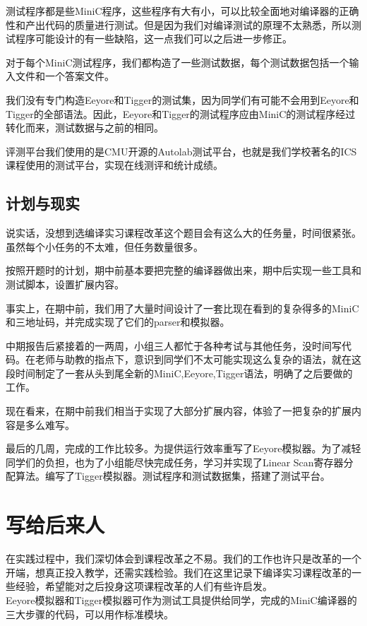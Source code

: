 \documentclass{ctexart}
\begin{document}
测试程序都是些MiniC程序，这些程序有大有小，可以比较全面地对编译器的正确性和产出代码的质量进行测试。但是因为我们对编译测试的原理不太熟悉，所以测试程序可能设计的有一些缺陷，这一点我们可以之后进一步修正。

对于每个MiniC测试程序，我们都构造了一些测试数据，每个测试数据包括一个输入文件和一个答案文件。

我们没有专门构造Eeyore和Tigger的测试集，因为同学们有可能不会用到Eeyore和Tigger的全部语法。因此，Eeyore和Tigger的测试程序应由MiniC的测试程序经过转化而来，测试数据与之前的相同。

评测平台我们使用的是CMU开源的Autolab测试平台，也就是我们学校著名的ICS课程使用的测试平台，实现在线测评和统计成绩。

\subsection{计划与现实}

说实话，没想到选编译实习课程改革这个题目会有这么大的任务量，时间很紧张。虽然每个小任务的不太难，但任务数量很多。

按照开题时的计划，期中前基本要把完整的编译器做出来，期中后实现一些工具和测试脚本，设置扩展内容。

事实上，在期中前，我们用了大量时间设计了一套比现在看到的复杂得多的MiniC和三地址码，并完成实现了它们的parser和模拟器。

中期报告后紧接着的一两周，小组三人都忙于各种考试与其他任务，没时间写代码。在老师与助教的指点下，意识到同学们不太可能实现这么复杂的语法，就在这段时间制定了一套从头到尾全新的MiniC,Eeyore,Tigger语法，明确了之后要做的工作。

现在看来，在期中前我们相当于实现了大部分扩展内容，体验了一把复杂的扩展内容是多么难写。

最后的几周，完成的工作比较多。为提供运行效率重写了Eeyore模拟器。为了减轻同学们的负担，也为了小组能尽快完成任务，学习并实现了Linear Scan寄存器分配算法。编写了Tigger模拟器。测试程序和测试数据集，搭建了测试平台。

\newpage
\section{写给后来人}

在实践过程中，我们深切体会到课程改革之不易。我们的工作也许只是改革的一个开端，想真正投入教学，还需实践检验。我们在这里记录下编译实习课程改革的一些经验，希望能对之后投身这项课程改革的人们有些许启发。
\\

Eeyore模拟器和Tigger模拟器可作为测试工具提供给同学，完成的MiniC编译器的三大步骤的代码，可以用作标准模块。
\end{document}
